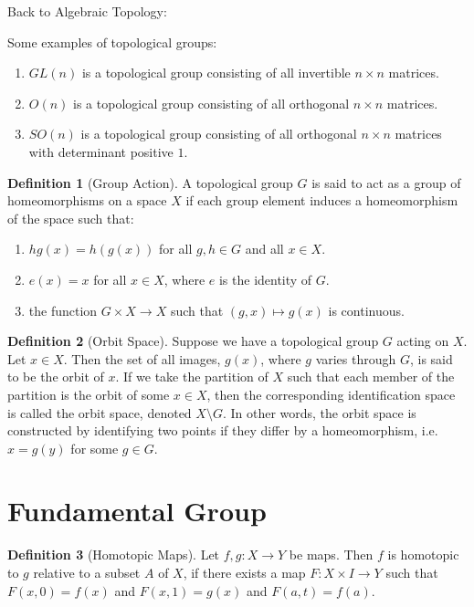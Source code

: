 \documentclass{article}
\theoremstyle{definition}
\newtheorem{definition}{Definition}[section]
\theoremstyle{remark}
\theoremstyle{remark}
\begin{document}
Back to Algebraic Topology:

Some examples of topological groups:
\begin{enumerate}
        \item $GL(n)$ is a topological group consisting of all invertible $n\times n$ matrices.
        \item $O(n)$ is a topological group consisting of all orthogonal $n\times n$ matrices.
        \item $SO(n)$ is a topological group consisting of all orthogonal $n\times n$ matrices with determinant positive $1$.
\end{enumerate}

\begin{definition}[Group Action]
    A topological group $G$ is said to act as a group of homeomorphisms on a space $X$ if each group element induces a homeomorphism of the space such that:
    \begin{enumerate}
        \item $hg(x) = h(g(x))$ for all $g, h \in G$ and all $x \in X$.
        \item $e(x) = x$ for all $x \in X$, where $e$ is the identity of $G$.
        \item the function $G \times X \to X$ such that $(g, x) \mapsto g(x)$ is continuous.
    \end{enumerate}
\end{definition}

\begin{definition}[Orbit Space]
    Suppose we have a topological group $G$ acting on $X$. Let $x \in X$. Then the set of all images, $g(x)$, where $g$ varies through $G$, is said to be the orbit of $x$. If we take the partition of $X$ such that each member of the partition is the orbit of some $x \in X$, then the corresponding identification space is called the orbit space, denoted $X \setminus G$. In other words, the orbit space is constructed by identifying two points if they differ by a homeomorphism, i.e. $x = g(y)$ for some $g \in G$. 
\end{definition}

\section{Fundamental Group}

\begin{definition}[Homotopic Maps]
    Let $f, g: X \to Y$ be maps. Then $f$ is homotopic to $g$ relative to a subset $A$ of $X$, if there exists a map $F: X \times I \to Y$ such that $F(x, 0) = f(x)$ and $F(x, 1) = g(x)$ and $F(a, t) = f(a)$. 
\end{definition}
\end{document}
